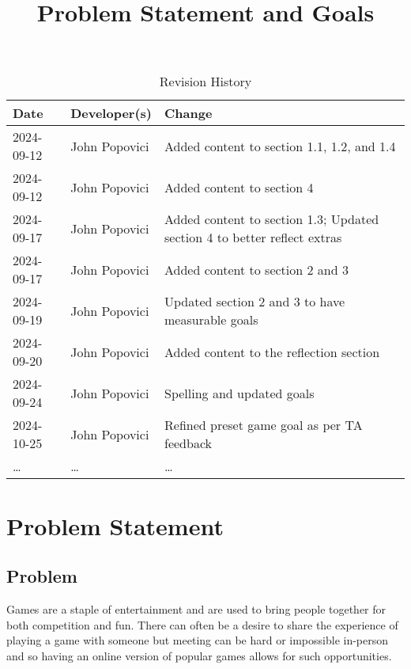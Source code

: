 \documentclass{article}
\title{Problem Statement and Goals\\\progname}
\author{\authname}
\date{}
\begin{document}
\maketitle

\begin{table}[hp]
\caption{Revision History} \label{TblRevisionHistory}
\begin{tabularx}{\textwidth}{llX}
\toprule
\textbf{Date} & \textbf{Developer(s)} & \textbf{Change}\\
\midrule
2024-09-12 & John Popovici & Added content to section 1.1, 1.2, and 1.4\\
2024-09-12 & John Popovici & Added content to section 4\\
2024-09-17 & John Popovici & Added content to section 1.3; Updated section 4 to better reflect extras\\
2024-09-17 & John Popovici & Added content to section 2 and 3\\
2024-09-19 & John Popovici & Updated section 2 and 3 to have measurable goals\\
2024-09-20 & John Popovici & Added content to the reflection section\\
2024-09-24 & John Popovici & Spelling and updated goals\\
2024-10-25 & John Popovici & Refined preset game goal as per TA feedback\\
\dots & \dots & \dots\\
\bottomrule
\end{tabularx}
\end{table}

\newpage
\section{Problem Statement}


\subsection{Problem}

Games are a staple of entertainment and are used to bring people together for both competition and fun.
There can often be a desire to share the experience of playing a game with someone but meeting can be hard or impossible in-person and so having an online version of popular games allows for such opportunities.
\end{document}
